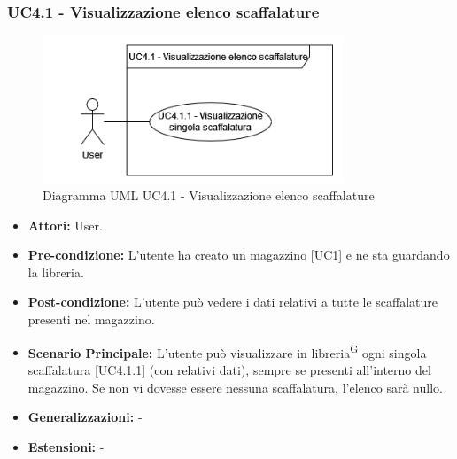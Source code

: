 \subsubsection{UC4.1 - Visualizzazione elenco scaffalature}
\begin{figure}[H]
  \centering
  \includegraphics[width=0.8\textwidth]{UC_diagrams_1-10/UC4.1.drawio.png}
   \caption{Diagramma UML UC4.1 - Visualizzazione elenco scaffalature}
\end{figure}
\begin{itemize}
    \item \textbf{Attori:} User.
    \item \textbf{Pre-condizione:}  L'utente ha creato un magazzino [UC1] e ne sta guardando la libreria.
    \item \textbf{Post-condizione:} L'utente può vedere i dati relativi a tutte le scaffalature presenti nel magazzino.
    \item \textbf{Scenario Principale:} L'utente può visualizzare in libreria\textsuperscript{G} ogni singola scaffalatura [UC4.1.1] (con relativi dati), sempre se presenti all'interno del magazzino. Se non vi dovesse essere nessuna scaffalatura, l'elenco sarà nullo.
    \item \textbf{Generalizzazioni:} -
    \item \textbf{Estensioni:} -
\end{itemize}


